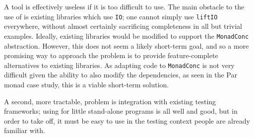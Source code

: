 A tool is effectively useless if it is too difficult to use. The main
obstacle to the use of \dejafu{} is existing libraries which use
\verb|IO|; one cannot simply use \verb|liftIO| everywhere, without
almost certainly sacrificing completeness in all but trivial
examples. Ideally, existing libraries would be modified to support the
\verb|MonadConc| abstraction. However, this does not seem a likely
short-term goal, and so a more promising way to approach the problem
is to provide feature-complete alternatives to existing libraries. As
adapting code to \verb|MonadConc| is not very difficult given the
ability to also modify the dependencies, as seen in the Par monad case
study, this is a viable short-term solution.

A second, more tractable, problem is integration with existing testing
frameworks; using \dejafu{} for little stand-alone programs is all
well and good, but in order to take off, it must be easy to use in the
testing context people are already familiar with.
